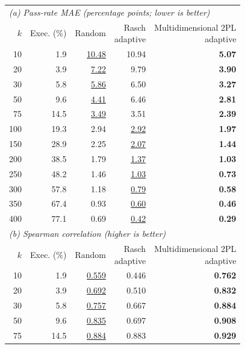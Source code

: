 \begin{table}[t]
  \centering
  \small
  \setlength{\tabcolsep}{3.5pt}
  \begin{tabular}{rrrrr}
    \toprule
    \multicolumn{5}{l}{\textit{(a) Pass-rate MAE (percentage points; lower is better)}} \\
    $k$ & Exec. (\%) & Random & \shortstack{Rasch\\adaptive} & \shortstack{Multidimensional 2PL\\adaptive} \\
    \midrule
    10 & 1.9 & \underline{10.48} & 10.94 & \textbf{5.07} \\
    20 & 3.9 & \underline{7.22} & 9.79 & \textbf{3.90} \\
    30 & 5.8 & \underline{5.86} & 6.50 & \textbf{3.27} \\
    50 & 9.6 & \underline{4.41} & 6.46 & \textbf{2.81} \\
    75 & 14.5 & \underline{3.49} & 3.51 & \textbf{2.39} \\
    100 & 19.3 & 2.94 & \underline{2.92} & \textbf{1.97} \\
    150 & 28.9 & 2.25 & \underline{2.07} & \textbf{1.44} \\
    200 & 38.5 & 1.79 & \underline{1.37} & \textbf{1.03} \\
    250 & 48.2 & 1.46 & \underline{1.03} & \textbf{0.73} \\
    300 & 57.8 & 1.18 & \underline{0.79} & \textbf{0.58} \\
    350 & 67.4 & 0.93 & \underline{0.60} & \textbf{0.46} \\
    400 & 77.1 & 0.69 & \underline{0.42} & \textbf{0.29} \\
    \midrule
    \multicolumn{5}{l}{\textit{(b) Spearman correlation (higher is better)}} \\
    $k$ & Exec. (\%) & Random & \shortstack{Rasch\\adaptive} & \shortstack{Multidimensional 2PL\\adaptive} \\
    \midrule
    10 & 1.9 & \underline{0.559} & 0.446 & \textbf{0.762} \\
    20 & 3.9 & \underline{0.692} & 0.510 & \textbf{0.832} \\
    30 & 5.8 & \underline{0.757} & 0.667 & \textbf{0.884} \\
    50 & 9.6 & \underline{0.835} & 0.697 & \textbf{0.908} \\
    75 & 14.5 & \underline{0.884} & 0.883 & \textbf{0.929} \\

\end{tabular}
\end{table}
